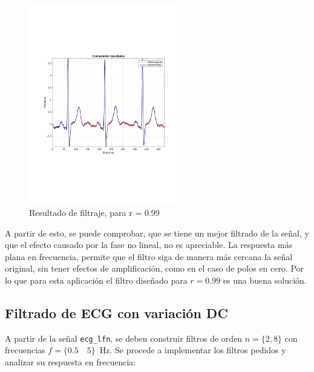		\begin{figure}[H]
			\center
			\includegraphics[width=0.6\textwidth,clip, trim = {1.9cm 6.8cm 2.3cm 7cm}]{../plots/egc_f_2_comparative.pdf}
			\caption{Resultado de filtraje, para r = 0.99}
			\label{fig:ecg_filter_r_099_result}
		\end{figure}
		
		A partir de esto, se puede comprobar, que se tiene un mejor filtrado de la señal, y que el efecto causado por la fase no lineal, no es apreciable. La respuesta más plana en frecuencia, permite que el filtro siga de manera más cercana la señal original, sin tener efectos de amplificación, como en el caso de polos en cero. Por lo que para esta aplicación el filtro diseñado para $r = 0.99$ es una buena solución. 
		
	\subsection{Filtrado de ECG con variación DC}
		A partir de la señal \texttt{ecg\_lfn}, se deben construir filtros de orden $n = \{2,8 \}$ con frecuencias $f = \{0.5 \quad 5\}$~Hz. Se procede a implementar los filtros pedidos y analizar su respuesta en frecuencia:
		
